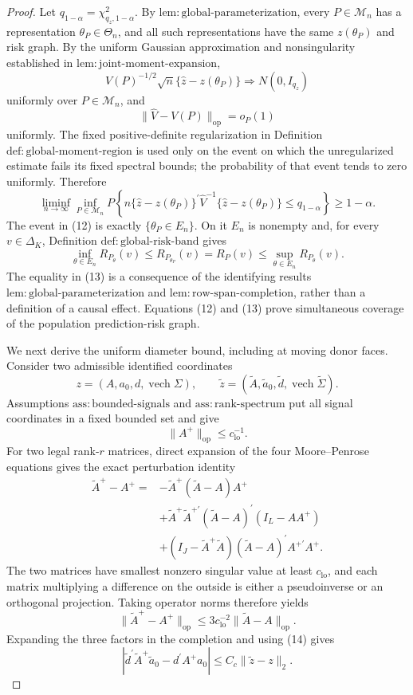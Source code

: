 \documentclass{article}
\begin{document}
\begin{proof}
Let \(q_{1-\alpha}=\chi^2_{q_z,1-\alpha}\).  By \(\mathrm{lem:global\mbox{-}parameterization}\), every \(P\in\mathcal M_n\) has a representation \(\theta_P\in\Theta_n\), and all such representations have the same \(z(\theta_P)\) and risk graph.  By the uniform Gaussian approximation and nonsingularity established in \(\mathrm{lem:joint\mbox{-}moment\mbox{-}expansion}\),
\[
V(P)^{-1/2}\sqrt n\{\widehat z-z(\theta_P)\}
\Longrightarrow N(0,I_{q_z})
\]
uniformly over \(P\in\mathcal M_n\), and
\[
\|\widehat V-V(P)\|_{\mathrm{op}}=o_P(1)
\]
uniformly.  The fixed positive-definite regularization in Definition \(\mathrm{def:global\mbox{-}moment\mbox{-}region}\) is used only on the event on which the unregularized estimate fails its fixed spectral bounds; the probability of that event tends to zero uniformly.  Therefore
\[
\liminf_{n\to\infty}\inf_{P\in\mathcal M_n}
P\!\left\{
n\{\widehat z-z(\theta_P)\}^{\prime}
\widehat V^{-1}
\{\widehat z-z(\theta_P)\}
\leq q_{1-\alpha}
\right\}
\geq1-\alpha.
\tag{12}
\]
The event in (12) is exactly \(\{\theta_P\in E_n\}\).  On it \(E_n\) is nonempty and, for every \(v\in\Delta_K\), Definition \(\mathrm{def:global\mbox{-}risk\mbox{-}band}\) gives
\[
\inf_{\theta\in E_n}R_{P_\theta}(v)
\leq R_{P_{\theta_P}}(v)=R_P(v)
\leq\sup_{\theta\in E_n}R_{P_\theta}(v).
\tag{13}
\]
The equality in (13) is a consequence of the identifying results \(\mathrm{lem:global\mbox{-}parameterization}\) and \(\mathrm{lem:row\mbox{-}span\mbox{-}completion}\), rather than a definition of a causal effect.  Equations (12) and (13) prove simultaneous coverage of the population prediction-risk graph.

We next derive the uniform diameter bound, including at moving donor faces.  Consider two admissible identified coordinates
\[
z=(A,a_0,d,\operatorname{vech}\Sigma),\qquad
\widetilde z=(\widetilde A,\widetilde a_0,
\widetilde d,\operatorname{vech}\widetilde\Sigma).
\]
Assumptions \(\mathrm{ass:bounded\mbox{-}signals}\) and \(\mathrm{ass:rank\mbox{-}spectrum}\) put all signal coordinates in a fixed bounded set and give
\[
\|A^+\|_{\mathrm{op}}\leq c_{\mathrm{lo}}^{-1}.
\]
For two legal rank-\(r\) matrices, direct expansion of the four Moore--Penrose equations gives the exact perturbation identity
\[
\begin{split}
\widetilde A^+-A^+
={}&-\widetilde A^+(\widetilde A-A)A^+\\
&+\widetilde A^+\widetilde A^{+\prime}
(\widetilde A-A)^{\prime}(I_L-AA^+)\\
&+(I_J-\widetilde A^+\widetilde A)
(\widetilde A-A)^{\prime}A^{+\prime}A^+.
\end{split}
\]
The two matrices have smallest nonzero singular value at least \(c_{\mathrm{lo}}\), and each matrix multiplying a difference on the outside is either a pseudoinverse or an orthogonal projection.  Taking operator norms therefore yields
\[
\|\widetilde A^+-A^+\|_{\mathrm{op}}
\leq 3c_{\mathrm{lo}}^{-2}
\|\widetilde A-A\|_{\mathrm{op}}.
\tag{14}
\]
Expanding the three factors in the completion and using (14) gives
\[
|\widetilde d^{\prime}\widetilde A^+\widetilde a_0
-d^{\prime}A^+a_0|
\leq C_c\|\widetilde z-z\|_2.
\tag{15}
\]


\end{proof}
\end{document}
